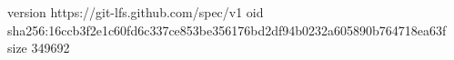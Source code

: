 version https://git-lfs.github.com/spec/v1
oid sha256:16ccb3f2e1c60fd6c337ce853be356176bd2df94b0232a605890b764718ea63f
size 349692
